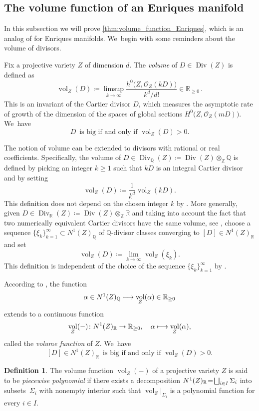 \documentclass[10pt]{amsart}
\newcommand\mto{\mathchoice{\longmapsto}{\mapsto}{\mapsto}{\mapsto}}
\let\oldbigsqcup\bigsqcup
\renewcommand{\bigsqcup}{\mathop{\textstyle\oldbigsqcup}\displaylimits}
\theoremstyle{plain}
\theoremstyle{definition}
\newtheorem{dfn}[thm]{Definition}
\newcommand{\Z}{\mathbb{Z}}
\newcommand{\Q}{\mathbb{Q}}
\newcommand{\R}{\mathbb{R}}
\newcommand{\OO}{\mathcal{O}}
\DeclareMathOperator{\vol}{vol}
\DeclareMathOperator{\Div}{Div}
\begin{document}
\subsection{The volume function of an Enriques manifold}
\label{subsection:volume_function_Enriques}

In this subsection we will prove \autoref{thm:volume_function_Enriques}, which is an analog of \cite[Th.\,1.6(2)]{Denisi23} for Enriques manifolds. We~begin with some reminders about the volume of divisors.

Fix a projective variety $Z$ of dimension $d$. The \emph{volume} of $D \in \Div(Z)$ is defined as
\[
\vol_Z (D) \coloneqq \limsup_{k \to \infty} \frac{h^0 \bigl(Z, \OO_Z(kD) \bigr)}{k^d/d!} \in \R_{\geq 0} \,.
\]
This is an invariant of the Cartier divisor $D$, which measures the asymptotic rate of growth of the dimension of the spaces of global sections $H^0 \bigl(Z, \OO_Z(mD) \bigr)$. We~have
\[
D \,\text{ is big if and only if } \vol_Z(D)>0.
\]

The notion of volume can be extended to divisors with rational or real coefficients. Specifically, the volume of $D \in \Div_{\Q}(Z) \coloneqq \Div(Z) \otimes_{\Z} \Q$ is defined by picking an integer $k \geq 1$ such that $kD$ is an integral Cartier divisor and by setting
\[
\vol_Z(D) \coloneqq \frac{1}{k^{d}} \vol_Z (kD).
\]
This definition does not depend on the chosen integer $k$ by \cite[Lem.\,2.2.38]{Laz04book_I}. More generally, given $D \in \Div_{\R}(Z) \coloneqq \Div(Z)\otimes_{\Z} \R$ and taking into account the fact that two numerically equivalent Cartier divisors have the same volume, see \cite[Prop.\,2.2.41]{Laz04book_I}, choose a sequence $\{\xi_k\}_{k=1}^\infty \subset N^1(Z)_\Q$ of $\Q$\nobreakdash-divisor classes converging to $[D] \in N^1(Z)_\R$ and set
\[
\vol_Z(D) \coloneqq \lim_{k \to \infty} \vol_Z(\xi_k).
\]
This definition is independent of the choice of the sequence $\{\xi_k\}_{k=1}^\infty$ by \cite[Th.\,2.2.44]{Laz04book_I}.

According to \cite[Cor.\,2.2.45]{Laz04book_I}, the function
\[
\alpha \in N^1(Z)_\Q \mto \vol_Z(\alpha) \in \R_{\geq 0}
\]
extends to a continuous function
\[
\vol_Z(-) \colon N^1(Z)_\R \to \R_{\geq 0}, \quad \alpha \mto \vol_Z(\alpha),
\]
called the \emph{volume function} of $Z$. We~have
\[
[D] \in N^1(Z)_\R \,\text{ is big if and only if } \vol_Z(D)>0.
\]

\begin{dfn}
\label{dfn:piecewise_polynomial}
The volume function $\vol_Z(-)$ of a projective variety $Z$ is said to be \emph{piecewise polynomial} if there exists a decomposition $N^1(Z)_\R \!=\! \bigsqcup_{i \in I} \Sigma_i$ into subsets~$\Sigma_i$ with nonempty interior such that $\vol_Z |_{\Sigma_i}$ is a polynomial function for every $i \!\in\! I$.
\end{dfn}
\end{document}
